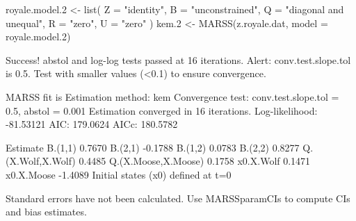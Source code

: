 \begin{Schunk}
\begin{Sinput}
 royale.model.2 <- list(
   Z = "identity", B = "unconstrained",
   Q = "diagonal and unequal", R = "zero", U = "zero"
 )
 kem.2 <- MARSS(z.royale.dat, model = royale.model.2)
\end{Sinput}
\begin{Soutput}
Success! abstol and log-log tests passed at 16 iterations.
Alert: conv.test.slope.tol is 0.5.
Test with smaller values (<0.1) to ensure convergence.

MARSS fit is
Estimation method: kem 
Convergence test: conv.test.slope.tol = 0.5, abstol = 0.001
Estimation converged in 16 iterations. 
Log-likelihood: -81.53121 
AIC: 179.0624   AICc: 180.5782   
 
                    Estimate
B.(1,1)               0.7670
B.(2,1)              -0.1788
B.(1,2)               0.0783
B.(2,2)               0.8277
Q.(X.Wolf,X.Wolf)     0.4485
Q.(X.Moose,X.Moose)   0.1758
x0.X.Wolf             0.1471
x0.X.Moose           -1.4089
Initial states (x0) defined at t=0

Standard errors have not been calculated. 
Use MARSSparamCIs to compute CIs and bias estimates.
\end{Soutput}
\end{Schunk}
